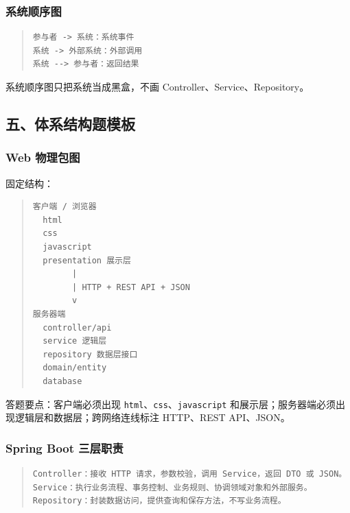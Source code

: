 \documentclass[UTF8,zihao=-4]{ctexart}
\begin{document}
\subsubsection{系统顺序图}


\begin{quote}
\footnotesize
\begin{verbatim}
参与者 -> 系统：系统事件
系统 -> 外部系统：外部调用
系统 --> 参与者：返回结果
\end{verbatim}
\end{quote}


系统顺序图只把系统当成黑盒，不画 Controller、Service、Repository。


\subsection{五、体系结构题模板}


\subsubsection{Web 物理包图}


固定结构：


\begin{quote}
\footnotesize
\begin{verbatim}
客户端 / 浏览器
  html
  css
  javascript
  presentation 展示层
        |
        | HTTP + REST API + JSON
        v
服务器端
  controller/api
  service 逻辑层
  repository 数据层接口
  domain/entity
  database
\end{verbatim}
\end{quote}


答题要点：客户端必须出现 \texttt{html}、\texttt{css}、\texttt{javascript} 和展示层；服务器端必须出现逻辑层和数据层；跨网络连线标注 HTTP、REST API、JSON。


\subsubsection{Spring Boot 三层职责}


\begin{quote}
\footnotesize
\begin{verbatim}
Controller：接收 HTTP 请求，参数校验，调用 Service，返回 DTO 或 JSON。
Service：执行业务流程、事务控制、业务规则、协调领域对象和外部服务。
Repository：封装数据访问，提供查询和保存方法，不写业务流程。
\end{verbatim}
\end{quote}
\end{document}
